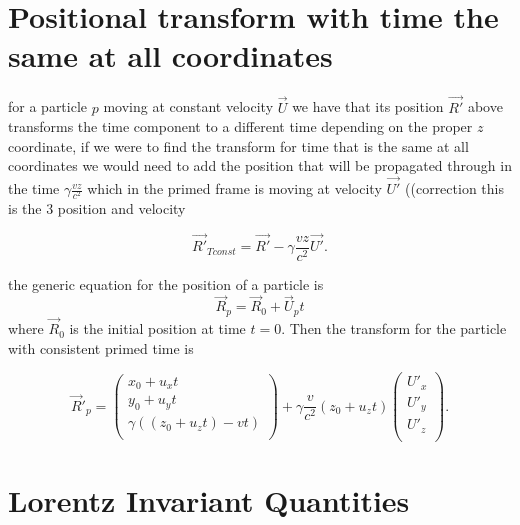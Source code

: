 \section{Positional transform with time the same at all coordinates}

for a particle $p$ moving at constant velocity $\Vec{U}$ we have that its position $\Vec{R'}$ above transforms the time component to a different time depending on the proper $z$ coordinate, if we were to find the transform for time that is the same at all coordinates we would need to add the position that will be propagated through in the time $\gamma \frac{vz}{c^2}$ which in the primed frame is moving at velocity $\Vec{U'}$ ((correction this is the 3 position and velocity

\begin{equation}%
\label{Generalised spacial transform}
    \Vec{R'}_{Tconst} = \Vec{R'} - \gamma \frac{vz}{c^2} \Vec{U'}.
\end{equation}%

the generic equation for the position of a particle is
\begin{equation}%
    \Vec{R}_p = \Vec{R}_0 +\Vec{U}_p t
\end{equation}%
where $\Vec{R}_0$ is the initial position at time $t=0$.
Then the transform for the particle with consistent primed time is

\begin{equation}%
\label{Particle transformation}
    \Vec{R}'_p = \begin{pmatrix}
    x_0 + u_{x} t\\ y_0 + u_{y} t \\ \gamma \left( (z_0 + u_{z} t) - vt \right) \\
    \end{pmatrix} + \gamma\dfrac{v}{c^2} \left(z_0 + u_{z} t\right)
    \begin{pmatrix}
    U'_{x} \\ U'_{y} \\ U'_{z} \\
    \end{pmatrix}.
\end{equation}%

\section{Lorentz Invariant Quantities}

